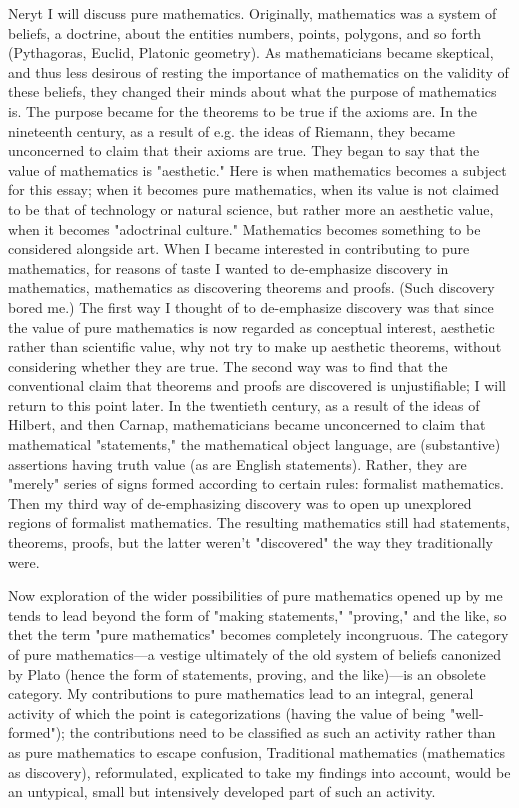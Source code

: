Neryt I will discuss pure mathematics. Originally, mathematics was a system of 
beliefs, a doctrine, about the entities numbers, points, polygons, and so forth (Pythagoras, 
Euclid, Platonic geometry). As mathematicians became skeptical, and thus less desirous 
of resting the importance of mathematics on the validity of these beliefs, they changed 
their minds about what the purpose of mathematics is. The purpose became for the theorems 
to be true if the axioms are. In the nineteenth century, as a result of e.g. the ideas 
of Riemann, they became unconcerned to claim that their axioms are true. They began 
to say that the value of mathematics is "aesthetic." Here is when mathematics becomes 
a subject for this essay; when it becomes pure mathematics, when its value is not claimed 
to be that of technology or natural science, but rather more an aesthetic value, when it 
becomes "adoctrinal culture." Mathematics becomes something to be considered alongside art. 
When I became interested in contributing to pure mathematics, for reasons of taste I wanted 
to de-emphasize discovery in mathematics, mathematics as discovering theorems and proofs. 
(Such discovery bored me.) The first way I thought of to de-emphasize discovery was that 
since the value of pure mathematics is now regarded as conceptual interest, aesthetic 
rather than scientific value, why not try to make up aesthetic theorems, without considering 
whether they are true. The second way was to find that the conventional claim that 
theorems and proofs are discovered is unjustifiable; I will return to this point later. 
In the twentieth century, as a result of the ideas of Hilbert, and then Carnap, 
mathematicians became unconcerned to claim that mathematical "statements," the 
mathematical object language, are (substantive) assertions having truth value (as are 
English statements). Rather, they are "merely" series of signs formed according to 
certain rules: formalist mathematics. Then my third way of de-emphasizing discovery was 
to open up unexplored regions of formalist mathematics. The resulting mathematics still 
had statements, theorems, proofs, but the latter weren't "discovered" the way they 
traditionally were. 

Now exploration of the wider possibilities of pure mathematics opened up by me 
tends to lead beyond the form of "making statements," "proving," and the like, so thet 
the term "pure mathematics" becomes completely incongruous. The category of pure 
mathematics---a vestige ultimately of the old system of beliefs canonized by Plato 
(hence the form of statements, proving, and the like)---is an obsolete category. My 
contributions to pure mathematics lead to an integral, general activity of which the 
point is categorizations (having the value of being "well-formed"); the contributions 
need to be classified as such an activity rather than as pure mathematics to escape 
confusion, Traditional mathematics (mathematics as discovery), reformulated, explicated 
to take my findings into account, would be an untypical, small but intensively developed 
part of such an activity. 


